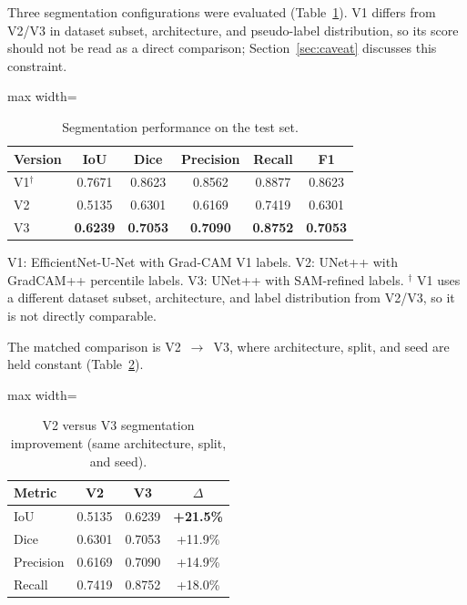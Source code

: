 \documentclass[final,5p,times,twocolumn,authoryear]{elsarticle}
\begin{document}
Three segmentation configurations were evaluated (Table~\ref{tab:segmentation}). V1 differs from V2/V3 in dataset subset, architecture, and pseudo-label distribution, so its score should not be read as a direct comparison; Section~\ref{sec:caveat} discusses this constraint.

\begin{table}[!htbp]
\centering
\caption{Segmentation performance on the test set.}
\label{tab:segmentation}
\footnotesize
\begin{adjustbox}{max width=\columnwidth}
\begin{tabular}{lccccc}
\toprule
\textbf{Version} & \textbf{IoU} & \textbf{Dice} & \textbf{Precision} & \textbf{Recall} & \textbf{F1} \\
\midrule
V1$^\dagger$ & 0.7671 & 0.8623 & 0.8562 & 0.8877 & 0.8623 \\
V2           & 0.5135 & 0.6301 & 0.6169 & 0.7419 & 0.6301 \\
V3           & \textbf{0.6239} & \textbf{0.7053} & \textbf{0.7090} & \textbf{0.8752} & \textbf{0.7053} \\
\bottomrule
\end{tabular}
\end{adjustbox}
\par\smallskip
\raggedright\scriptsize V1: EfficientNet-U-Net with Grad-CAM V1 labels. V2: UNet++ with GradCAM++ percentile labels. V3: UNet++ with SAM-refined labels. $^\dagger$ V1 uses a different dataset subset, architecture, and label distribution from V2/V3, so it is not directly comparable.
\end{table}

The matched comparison is V2~$\to$~V3, where architecture, split, and seed are held constant (Table~\ref{tab:v2v3}).

\begin{table}[!htbp]
\centering
\caption{V2 versus V3 segmentation improvement (same architecture, split, and seed).}
\label{tab:v2v3}
\begin{adjustbox}{max width=\columnwidth}
\begin{tabular}{lccc}
\toprule
\textbf{Metric} & \textbf{V2} & \textbf{V3} & \textbf{$\Delta$} \\
\midrule
IoU       & 0.5135 & 0.6239 & \textbf{+21.5\%} \\
Dice      & 0.6301 & 0.7053 & +11.9\% \\
Precision & 0.6169 & 0.7090 & +14.9\% \\
Recall    & 0.7419 & 0.8752 & +18.0\% \\
\bottomrule
\end{tabular}
\end{adjustbox}
\end{table}
\end{document}
